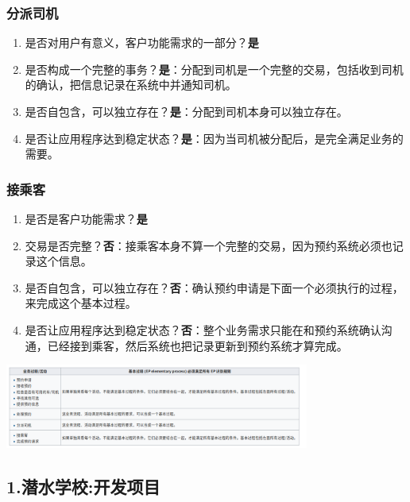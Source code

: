 \hypertarget{ux5206ux6d3eux53f8ux673a}{%
\subsubsection{分派司机}\label{ux5206ux6d3eux53f8ux673a}}

\begin{enumerate}
\tightlist
\item
  是否对用户有意义，客户功能需求的一部分？\textbf{是}
\item
  是否构成一个完整的事务？\textbf{是}：分配到司机是一个完整的交易，包括收到司机的确认，把信息记录在系统中并通知司机。
\item
  是否自包含，可以独立存在？\textbf{是}：分配到司机本身可以独立存在。
\item
  是否让应用程序达到稳定状态？\textbf{是}：因为当司机被分配后，是完全满足业务的需要。
\end{enumerate}

\hypertarget{ux63a5ux4e58ux5ba2}{%
\subsubsection{接乘客}\label{ux63a5ux4e58ux5ba2}}

\begin{enumerate}
\tightlist
\item
  是否是客户功能需求？\textbf{是}
\item
  交易是否完整？\textbf{否}：接乘客本身不算一个完整的交易，因为预约系统必须也记录这个信息。
\item
  是否自包含，可以独立存在？\textbf{否}：确认预约申请是下面一个必须执行的过程，来完成这个基本过程。
\item
  是否让应用程序达到稳定状态？\textbf{否}：整个业务需求只能在和预约系统确认沟通，已经接到乘客，然后系统也把记录更新到预约系统才算完成。
\end{enumerate}


\includegraphics[width=10cm]{Screenshotfrom2022122020-34-37.png}


\hypertarget{ux4e0eux56fdux9645ux529fux80fdux70b9ifpugux7684ux504fux5dee}{%
\subsection{1.潜水学校:开发项目 }\label{ux4e0eux56fdux9645ux529fux80fdux70b9ifpugux7684ux504fux5dee}}


